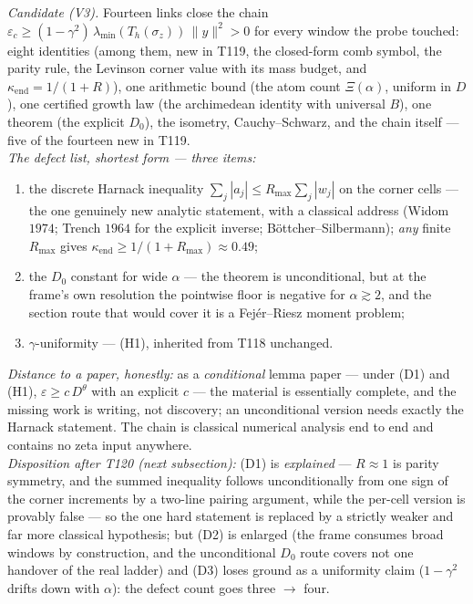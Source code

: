 \documentclass[11pt,a4paper]{article}
\begin{document}
\begin{keybox}
\emph{Candidate (V3).} Fourteen links close the chain
$\varepsilon_c\ge(1-\gamma^2)\,\lambda_{\min}(T_h(\sigma_z))\,\|y\|^2>0$ for every window the
probe touched: eight identities (among them, new in T119, the closed-form comb symbol, the
parity rule, the Levinson corner value with its mass budget, and
$\kappa_{\mathrm{end}}=1/(1+R)$), one arithmetic bound (the atom count $\Xi(\alpha)$, uniform
in $D$), one certified growth law (the archimedean identity with universal $B$), one theorem
(the explicit $D_0$), the isometry, Cauchy--Schwarz, and the chain itself --- five of the
fourteen new in T119.\\[3pt]
\emph{The defect list, shortest form --- three items:}
\begin{enumerate}[leftmargin=1.6em]
\item[\textbf{(D1)}] the discrete Harnack inequality
$\sum_j|a_j|\le R_{\max}\sum_j|w_j|$ on the corner cells --- the one genuinely new analytic
statement, with a classical address (Widom $1974$; Trench $1964$ for the explicit inverse;
B\"ottcher--Silbermann); \emph{any} finite $R_{\max}$ gives
$\kappa_{\mathrm{end}}\ge1/(1+R_{\max})\approx0.49$;
\item[\textbf{(D2)}] the $D_0$ constant for wide $\alpha$ --- the theorem is unconditional,
but at the frame's own resolution the pointwise floor is negative for $\alpha\gtrsim2$, and
the section route that would cover it is a Fej\'er--Riesz moment problem;
\item[\textbf{(D3)}] $\gamma$-uniformity --- (H1), inherited from T118 unchanged.
\end{enumerate}
\emph{Distance to a paper, honestly:} as a \emph{conditional} lemma paper --- under (D1) and
(H1), $\varepsilon\ge c\,D^{\theta}$ with an explicit $c$ --- the material is essentially
complete, and the missing work is writing, not discovery; an unconditional version needs
exactly the Harnack statement. The chain is classical numerical analysis end to end and
contains no zeta input anywhere.\\[3pt]
\emph{Disposition after T120 (next subsection):} (D1) is \emph{explained} --- $R\approx1$ is
parity symmetry, and the summed inequality follows unconditionally from one sign of the corner
increments by a two-line pairing argument, while the per-cell version is provably false ---
so the one hard statement is replaced by a strictly weaker and far more classical hypothesis;
but (D2) is enlarged (the frame consumes broad windows by construction, and the unconditional
$D_0$ route covers not one handover of the real ladder) and (D3) loses ground as a uniformity
claim ($1-\gamma^2$ drifts down with $\alpha$): the defect count goes three $\to$ four.
\end{keybox}
\end{document}
